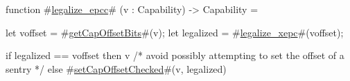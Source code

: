 function #\hyperref[sailRISCVzlegalizzezyepcc]{legalize\_epcc}# (v : Capability) -> Capability = {
  let voffset = #\hyperref[sailRISCVzgetCapOffsetBits]{getCapOffsetBits}#(v);
  let legalized = #\hyperref[sailRISCVzlegalizzezyxepc]{legalize\_xepc}#(voffset);

  if   legalized == voffset
  then v /* avoid possibly attempting to set the offset of a sentry */
  else #\hyperref[sailRISCVzsetCapOffsetChecked]{setCapOffsetChecked}#(v, legalized)
}
